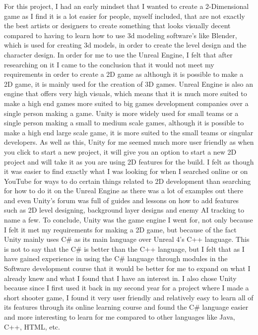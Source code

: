 For this project, I had an early mindset that I wanted to create a 2-Dimensional game as I find it is a lot easier for people, myself included, that are not exactly the best artists or designers to create something that looks visually decent compared to having to learn how to use 3d modeling software's like Blender, which is used for creating 3d models, in order to create the level design and the character design. In order for me to use the Unreal Engine, I felt that after researching on it I came to the conclusion that it would not meet my requirements in order to create a 2D game as although it is possible to make a 2D game, it is mainly used for the creation of 3D games. Unreal Engine is also an engine that offers very high visuals, which means that it is much more suited to make a high end games more suited to big games development companies over a single person making a game.
Unity is more widely used for small teams or a single person making a small to medium scale games, although it is possible to make a high end large scale game, it is more suited to the small teams or singular developers. As well as this, Unity for me seemed much more user friendly as when you click to start a new project, it will give you an option to start a new 2D project and will take it as you are using 2D features for the build. I felt as though it was easier to find exactly what I was looking for when I searched online or on YouTube for ways to do certain things related to 2D development than searching for how to do it on the Unreal Engine as there was a lot of examples out there and even Unity's forum was full of guides and lessons on how to add features such as 2D level designing, background layer designs and enemy AI tracking to name a few.
To conclude, Unity was the game engine I went for, not only because I felt it met my requirements for making a 2D game, but because of the fact Unity mainly uses C\# as its main language over Unreal 4's C++ language. This is not to say that the C\# is better than the C++ language, but I felt that as I have gained experience in using the C\# language through modules in the Software development course that it would be better for me to expand on what I already knew and what I found that I have an interest in. I also chose Unity because since I first used it back in my second year for a project where I made a short shooter game, I found it very user friendly and relatively easy to learn all of its features through its online learning course and found the C\# language easier and more interesting to learn for me compared to other languages like Java, C++, HTML, etc.\cite{UnityVUnreal}

